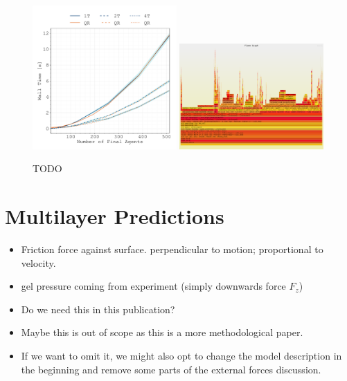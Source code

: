 \documentclass{article}
\begin{document}
\begin{figure}[H]
    \centering
    \includegraphics[width=0.49\textwidth]
        {docs/source/_static/performance/computation-time-with-initial-agents.pdf}
    \includegraphics[width=0.49\textwidth]{docs/source/_static/performance/flamegraph.pdf}
    \caption{TODO}
    \label{fig:performance}
\end{figure}

\section{Multilayer Predictions}

\begin{itemize}
    \item Friction force against surface. perpendicular to motion; proportional to velocity.
    \item gel pressure coming from experiment (simply downwards force $F_z$)
\end{itemize}

\begin{itemize}
    \item Do we need this in this publication?
    \item Maybe this is out of scope as this is a more methodological paper.
    \item If we want to omit it, we might also opt to change the model description in the beginning
        and remove some parts of the external forces discussion.
\end{itemize}
\end{document}
